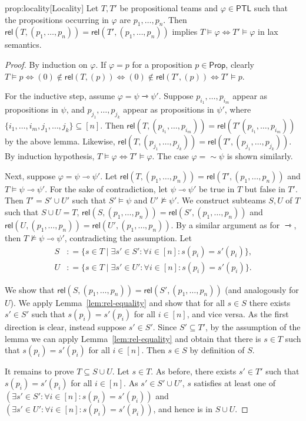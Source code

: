 \documentclass[a4paper,english,fleqn,11pt,final]{scrartcl}
\newcommand{\negg}{{\sim}}
\newcommand{\logic}[1]{\ensuremath{\mathsf{#1}}\xspace}
\newcommand{\PS}{\logic{Prop}}
\newcommand{\PTL}{\logic{PTL}}
\providecommand{\dfn}{\mathrel{\mathop:}=}
\newcommand{\limp}{\multimap}
\newcommand{\timp}{\rightarrowtriangle}
\newcommand{\rel}{\mathsf{rel}}
\theoremstyle{plain}
\theoremstyle{definition}
\begin{document}
\begin{repproposition}{prop:locality}[Locality]
Let $T,T'$ be propositional teams and $\varphi \in \PTL$ such that the propositions occurring in $\varphi$ are $p_1, \ldots, p_n$.
Then $\rel(T,(p_1,\ldots,p_n)) = \rel(T',(p_1,\ldots,p_n))$ implies $T \vDash \varphi \Leftrightarrow T' \vDash \varphi$ in lax semantics.
\end{repproposition}
\begin{proof}
By induction on $\varphi$.
If $\varphi = p$ for a proposition $p \in \PS$, clearly $T \vDash p \Leftrightarrow (0) \notin \rel(T,(p)) \Leftrightarrow (0) \notin \rel(T',(p)) \Leftrightarrow T' \vDash p$.

For the inductive step, assume $\varphi = \psi \timp \psi'$.
Suppose $p_{i_1},\ldots,p_{i_m}$ appear as propositions in $\psi$, and $p_{j_1},\ldots,p_{j_k}$ appear as propositions in $\psi'$, where $\{i_1,\ldots,i_m,j_1,\ldots,j_k\} \subseteq [n]$.
Then $\rel(T,(p_{i_1},\ldots,p_{i_m})) = \rel(T'(p_{i_1},\ldots,p_{i_m}))$ by the above lemma.
Likewise, $\rel(T,(p_{j_1},\ldots,p_{j_k})) = \rel(T',(p_{j_1},\ldots,p_{j_k}))$.
By induction hypothesis, $T \vDash \varphi \Leftrightarrow T' \vDash \varphi$.
The case $\varphi = \negg \psi$ is shown similarly.

Next, suppose $\varphi = \psi \limp \psi'$.
Let $\rel(T,(p_1,\ldots,p_n)) = \rel(T',(p_1,\ldots,p_n))$ and $T \vDash \psi \limp \psi'$.
For the sake of contradiction, let $\psi \limp \psi'$ be true in $T$ but false in $T'$.
Then $T' = S' \cup U'$ such that $S' \vDash \psi$ and $U' \nvDash \psi'$.
We construct subteams $S,U$ of $T$ such that $S \cup U = T$, $\rel(S,(p_1,\ldots,p_n)) = \rel(S',(p_1,\ldots,p_n))$ and $\rel(U,(p_1,\ldots,p_n)) = \rel(U',(p_1,\ldots,p_n))$.
By a similar argument as for $\timp$, then $T \nvDash \psi \limp \psi'$, contradicting the assumption.
Let
\begin{align*}
S &\dfn \{ s \in T \mid \exists s' \in S' : \forall i \in [n] : s(p_i) = s'(p_i) \}\text{,}\\
U &\dfn \{ s \in T \mid \exists s' \in U' : \forall i \in [n] : s(p_i) = s'(p_i) \}\text{.}
\end{align*}

We show that $\rel(S,(p_1,\ldots,p_n)) = \rel(S',(p_1,\ldots,p_n))$  (and analogously for $U$).
We apply Lemma~\ref{lem:rel-equality} and show that for all $s \in S$ there exists  $s' \in S'$ such that $s(p_i) = s'(p_i)$ for all $i \in [n]$, and vice versa.
As the first direction is clear, instead suppose $s' \in S'$.
Since $S' \subseteq T'$, by the assumption of the lemma we can apply Lemma~\ref{lem:rel-equality} and obtain that there is $s \in T$ such that $s(p_i) = s'(p_i)$ for all $i \in [n]$.
Then $s \in S$ by definition of $S$.

It remains to prove $T \subseteq S \cup U$.
Let $s \in T$.
As before, there exists $s' \in T'$ such that $s(p_i) = s'(p_i)$ for all $i \in [n]$.
As $s' \in S' \cup U'$, $s$ satisfies at least one of $(\exists s' \in S' : \forall i \in [n] : s(p_i) = s'(p_i))$ and $(\exists s' \in U' : \forall i \in [n] : s(p_i) = s'(p_i))$, and hence is in $S \cup U$.
\end{proof}
\end{document}

